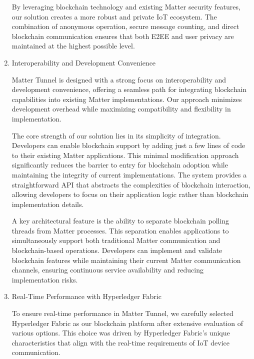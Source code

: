\documentclass[conference]{IEEEtran}
\begin{document}
\begin{enumerate}[itemsep=2ex, parsep=1ex]
\begin{enumerate}[itemsep=2ex, parsep=1ex]
	      \end{enumerate}
	      
	      By leveraging blockchain technology and existing Matter security features, our solution creates a more robust and private IoT ecosystem. The combination of anonymous operation, secure message counting, and direct blockchain communication ensures that both E2EE and user privacy are maintained at the highest possible level.
	      
	\item Interoperability and Development Convenience
	      
	      Matter Tunnel is designed with a strong focus on interoperability and development convenience, offering a seamless path for integrating blockchain capabilities into existing Matter implementations. Our approach minimizes development overhead while maximizing compatibility and flexibility in implementation.
	      
	      The core strength of our solution lies in its simplicity of integration. Developers can enable blockchain support by adding just a few lines of code to their existing Matter applications. This minimal modification approach significantly reduces the barrier to entry for blockchain adoption while maintaining the integrity of current implementations. The system provides a straightforward API that abstracts the complexities of blockchain interaction, allowing developers to focus on their application logic rather than blockchain implementation details.
	      
	      A key architectural feature is the ability to separate blockchain polling threads from Matter processes. This separation enables applications to simultaneously support both traditional Matter communication and blockchain-based operations. Developers can implement and validate blockchain features while maintaining their current Matter communication channels, ensuring continuous service availability and reducing implementation risks.
	      
	\item Real-Time Performance with Hyperledger Fabric
	      
	      To ensure real-time performance in Matter Tunnel, we carefully selected Hyperledger Fabric as our blockchain platform after extensive evaluation of various options. This choice was driven by Hyperledger Fabric's unique characteristics that align with the real-time requirements of IoT device communication.
	      

\end{enumerate}
\end{document}

